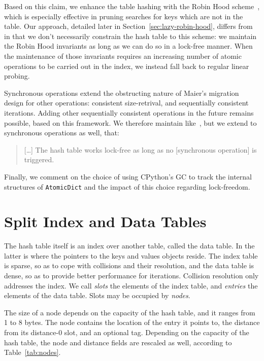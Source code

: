 Based on this claim, we enhance the table hashing with the Robin Hood scheme~\cite{robin-hood,bolt}, which is especially effective in pruning searches for keys which are not in the table.
Our approach, detailed later in Section~\ref{sec:lazy-robin-hood}, differs from~\cite{bolt} in that we don't necessarily constrain the hash table to this scheme: we maintain the Robin Hood invariants as long as we can do so in a lock-free manner.
When the maintenance of those invariants requires an increasing number of atomic operations to be carried out in the index, we instead fall back to regular linear probing.

Synchronous operations extend the obstructing nature of Maier's migration design for other operations: consistent size-retrival, and sequentially consistent iterations.
Adding other sequentially consistent operations in the future remains possible, based on this framework.
We therefore maintain like~\cite{maier}, but we extend to synchronous operations as well, that:
\begin{quote}
[\ldots]
    The hash table works lock-free as long as no [synchronous operation] is triggered.
\end{quote}

Finally, we comment on the choice of using CPython's GC to track the internal structures of \texttt{AtomicDict} and the impact of this choice regarding lock-freedom.


\section{Split Index and Data Tables}\label{sec:python-dict}

The hash table itself is an index over another table, called the data table.
In the latter is where the pointers to the keys and values objects reside.
The index table is sparse, so as to cope with collisions and their resolution, and the data table is dense, so as to provide better performance for iterations.
Collision resolution only addresses the index.
We call \emph{slots} the elements of the index table, and \emph{entries} the elements of the data table.
Slots may be occupied by \emph{nodes}.

The size of a node depends on the capacity of the hash table, and it ranges from 1 to 8 bytes.
The node contains the location of the entry it points to, the distance from its distance-0 slot, and an optional tag.
Depending on the capacity of the hash table, the node and distance fields are rescaled as well, according to Table~\ref{tab:nodes}.

